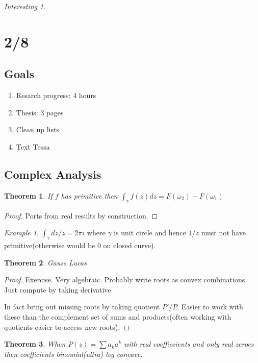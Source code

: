 \documentclass[11pt]{article}
\newtheorem{theorem}{Theorem}
\theoremstyle{remark}
\newtheorem{interest}{Interesting}
\newtheorem{example}{Example}
\begin{document}
\begin{interest}
\section{2/8}

\subsection{Goals}

\begin{enumerate}
	\item Resarch progress: 4 hours
	\item Thesis: 3 pages
	\item Clean up lists
	\item Text Tessa
\end{enumerate}

\subsection{Complex Analysis}

\begin{theorem}
	If $f$ has primitive then $\int_{\gamma} f(z)dz = F(\omega_2) - F(\omega_1)$
\end{theorem}

\begin{proof}
	Ports from real results by construction.
\end{proof}

\begin{example}
	$\int_{\gamma} dz/z=2\pi i$ where $\gamma$ is unit circle and hence $1/z$ must not have primitive(otherwise would be 0 on closed curve).
\end{example}

\begin{theorem}
	Gauss Lucas
\end{theorem}

\begin{proof}
	Exercise. Very algebraic. Probably write roots as convex combinations. Just compute by taking derivative

	In fact bring out missing roots by taking quotient $P'/P$. Easier to work with these than the complement set of sums and products(often working with quotients easier to access new roots).
\end{proof}

\begin{theorem}
	When $P(z) = \sum a_k a^k$ with real coeffiecients and only real zeroes then coefficients binomial(ultra) log concave.
\end{theorem}


\end{interest}
\end{document}
